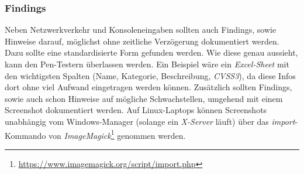 		\subsubsection{Findings}
		Neben Netzwerkverkehr und Konsoleneingaben sollten auch Findings, sowie Hinweise darauf, möglichst ohne zeitliche Verzögerung dokumentiert werden. Dazu sollte eine standardisierte Form gefunden werden. Wie diese genau aussieht, kann den Pen-Testern überlassen werden. Ein Beispiel wäre ein \textit{Excel-Sheet} mit den wichtigsten Spalten (Name, Kategorie, Beschreibung, \textit{CVSS3}), da diese Infos dort ohne viel Aufwand eingetragen werden können. Zusätzlich sollten Findings, sowie auch schon Hinweise auf mögliche Schwachstellen, umgehend mit einem Screenshot dokumentiert werden. Auf Linux-Laptops können Screenshots unabhängig vom Windows-Manager (solange ein \textit{X-Server} läuft) über das \textit{import}-Kommando von \textit{ImageMagick}\footnote{\url{https://www.imagemagick.org/script/import.php}} genommen werden.